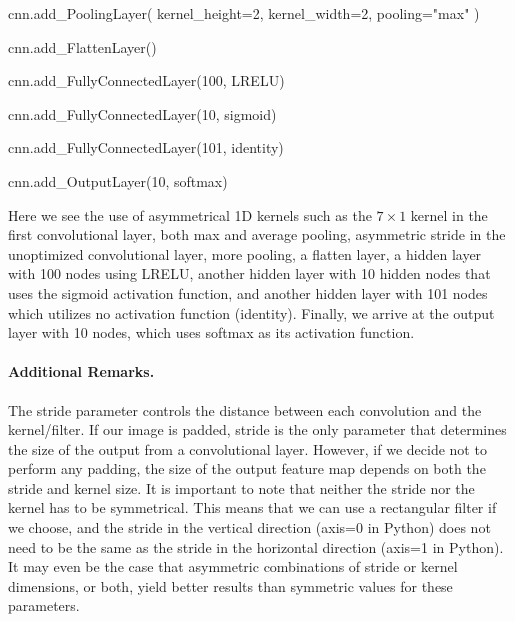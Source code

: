 \documentclass[%
oneside,                 %
final,                   %
10pt]{article}
\begin{document}
cnn.add_PoolingLayer(
    kernel_height=2,
    kernel_width=2,
    pooling="max"
)

cnn.add_FlattenLayer()

cnn.add_FullyConnectedLayer(100, LRELU)

cnn.add_FullyConnectedLayer(10, sigmoid)

cnn.add_FullyConnectedLayer(101, identity)

cnn.add_OutputLayer(10, softmax)

\epycod


Here we see the use of asymmetrical 1D kernels such as the $7 \times
1$ kernel in the first convolutional layer, both max and average
pooling, asymmetric stride in the unoptimized convolutional layer,
more pooling, a flatten layer, a hidden layer with 100 nodes using
LRELU, another hidden layer with 10 hidden nodes that uses the sigmoid
activation function, and another hidden layer with 101 nodes which
utilizes no activation function (identity). Finally, we arrive at the
output layer with 10 nodes, which uses softmax as its activation
function.

\paragraph{Additional Remarks.}
The stride parameter controls the distance between each convolution
and the kernel/filter. If our image is padded, stride is the only
parameter that determines the size of the output from a convolutional
layer. However, if we decide not to perform any padding, the size of
the output feature map depends on both the stride and kernel size. It
is important to note that neither the stride nor the kernel has to be
symmetrical. This means that we can use a rectangular filter if we
choose, and the stride in the vertical direction (axis=0 in Python)
does not need to be the same as the stride in the horizontal direction
(axis=1 in Python). It may even be the case that asymmetric
combinations of stride or kernel dimensions, or both, yield better
results than symmetric values for these parameters.
\end{document}
